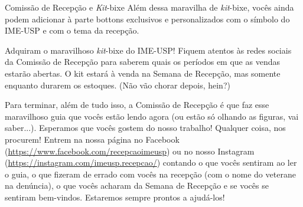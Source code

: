 \begin{secao}{Comissão de Recepção e \textit{Kit}-bixe}
Além dessa maravilha de \textit{kit}-bixe, vocês ainda podem adicionar à parte bottons
exclusivos e personalizados com o símbolo do IME-USP e com o tema da recepção.

Adquiram o maravilhoso \textit{kit}-bixe do IME-USP! Fiquem atentos às redes sociais da
Comissão de Recepção para saberem quais os períodos em que as vendas estarão abertas.
O kit estará à venda na Semana de Recepção, mas somente enquanto
durarem os estoques. (Não vão chorar depois, hein?)

Para terminar, além de tudo isso, a Comissão de Recepção é que faz esse maravilhoso 
guia que vocês estão lendo agora (ou estão só olhando as figuras, vai saber...). 
Esperamos que vocês gostem do nosso trabalho! Qualquer coisa, nos
procurem! Entrem na nossa página no Facebook (\url{https://www.facebook.com/recepcaoimeusp}) 
ou no nosso Instagram (\url{https://instagram.com/imeusp.recepcao/}) contando
o que vocês sentiram ao ler o guia, o que fizeram de errado com vocês na
recepção (com o nome do veterane na denúncia), o que vocês acharam da Semana
de Recepção e se vocês se sentiram bem-vindos. Estaremos sempre prontos a ajudá-los!
\end{secao}
